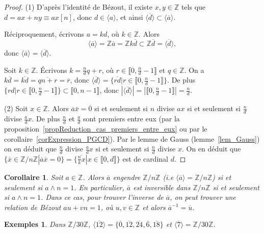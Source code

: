 \documentclass[12pt]{report}
\newtheorem*{exs}{Exemples}
\newtheorem{Cor}[thm]{Corollaire}
\newcommand{\Z}{\mathbb{Z}}
\begin{document}
\begin{proof}
(1) D'après l'identité de Bézout,  il existe $x,y \in \mathbb{Z}$ tels que $d=ax+ny \equiv ax [n]$, donc $d \in \langle a \rangle$, et ainsi $\langle \overline{d} \rangle \subset \langle \overline{a} \rangle $.\par 
Réciproquement, écrivons $a=kd$, où $k\in \Z$. Alors \[\langle \overline{a}\rangle =\Z \overline{a}=\Z k \overline{d}\subset \Z \overline{d}=\langle \overline{d}\rangle,\] donc $\langle \overline{a}\rangle=\langle\overline{d}\rangle$.


 Soit $k\in \Z$. Écrivons $k=\frac{n}{d} q+r$, où $r\in \llbracket 0,\frac{n}{d}-1\rrbracket$ et $q\in \Z$.  On a $k\overline{d}=\overline{kd}=\overline{qn+r}=\overline{r}$, donc $\langle \overline{d}\rangle= \{\overline{rd}|r\in \llbracket 0,\frac{n}{d}-1\rrbracket\}$. De plus $\{rd|r\in \llbracket 0,\frac{n}{d}-1\rrbracket \}\subset \llbracket 0,n-1\rrbracket$, donc $|\langle \overline{d}\rangle|= |\llbracket 0,\frac{n}{d}-1\rrbracket|=\frac{n}{d}$.
 
 (2) Soit $x\in \Z$. Alors $\overline{a}\overline{x}=\overline{0}$ si et seulement si $n$ divise $ax$ si et seulement si $\frac{n}{d}$ divise $\frac{a}{d}x$. De plus $\frac{n}{d}$ et $\frac{a}{d}$ sont premiers entre eux (par la proposition~\ref{propReduction_cas_premiers_entre_eux} ou par le corollaire~\ref{corExpression_PGCD}). Par le lemme de Gauss (lemme~\ref{lem_Gauss}) on en déduit que $\frac{n}{d}$ divise $\frac{a}{d}x$ si et seulement si $\frac{n}{d}$ divise $x$. On en déduit que $\{\overline{x}\in \Z/n\Z| \overline{a}\overline{x}=0\}=\{\overline{\frac{n}{k}x}|x\in \llbracket 0,d\rrbracket\}$ est de cardinal $d$.
\end{proof}


\begin{Cor}\label{corInversibles_de_ZnZ}
Soit $a\in \Z$. Alors $\overline{a}$ engendre $\Z/n\Z$ (i.e $\langle \overline{a}\rangle =\Z/n\Z$) si et seulement si $a\wedge n=1$. En particulier, $\overline{a}$ est inversible dans $\Z/n\Z$ si et seulement si $a\wedge n=1$. Dans ce cas, pour trouver l'inverse de $\overline{a}$, on peut trouver une relation de Bézout $au+vn=1$, où $u,v\in \Z$ et alors $\overline{a}^{-1}=\overline{u}$.
\end{Cor}



\begin{exs}
Dans $\mathbb{Z}/30\mathbb{Z}$, $\langle \overline{12} \rangle = \{ \overline{0},\overline{12},\overline{24},\overline{6},\overline{18} \}$ et $\langle \overline{7} \rangle = \mathbb{Z}/30 \mathbb{Z}$.
\end{exs}
\end{document}
